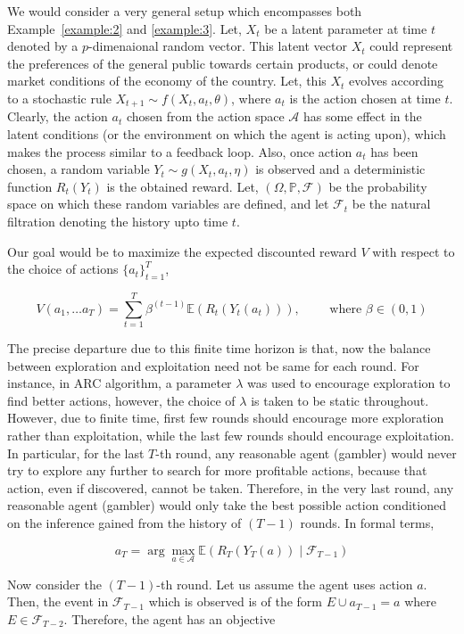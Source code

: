 \documentclass[11pt]{article}
\newcommand{\E}{\mathbb{E}}
\newcommand{\Acal}{\mathcal{A}}
\newcommand{\Fcal}{\mathcal{F}}
\newcommand{\prob}{\mathbb{P}}
\begin{document}
We would consider a very general setup which encompasses both Example~\ref{example:2} and \ref{example:3}. Let, $X_t$ be a latent parameter at time $t$ denoted by a $p$-dimenaional random vector. This latent vector $X_t$ could represent the preferences of the general public towards certain products, or could denote market conditions of the economy of the country. Let, this $X_t$ evolves according to a stochastic rule $X_{t+1} \sim f(X_t, a_t, \theta)$, where $a_t$ is the action chosen at time $t$. Clearly, the action $a_t$ chosen from the action space $\mathcal{A}$ has some effect in the latent conditions (or the environment on which the agent is acting upon), which makes the process similar to a feedback loop. Also, once action $a_t$ has been chosen, a random variable $Y_t \sim g(X_t, a_t, \eta)$ is observed and a deterministic function $R_t(Y_t)$ is the obtained reward. Let, $(\Omega, \prob, \Fcal)$ be the probability space on which these random variables are defined, and let $\Fcal_{t}$ be the natural filtration denoting the history upto time $t$.

Our goal would be to maximize the expected discounted reward $V$ with respect to the choice of actions $\{a_t\}_{t = 1}^{T}$,

$$
V(a_1, \dots a_T) = \sum_{t = 1}^T \beta^{(t-1)} \E(R_t(Y_t(a_t))), \qquad \text{ where } \beta \in (0, 1)
$$

The precise departure due to this finite time horizon is that, now the balance between exploration and exploitation need not be same for each round. For instance, in ARC algorithm, a parameter $\lambda$ was used to encourage exploration to find better actions, however, the choice of $\lambda$ is taken to be static throughout. However, due to finite time, first few rounds should encourage more exploration rather than exploitation, while the last few rounds should encourage exploitation. In particular, for the last $T$-th round, any reasonable agent (gambler) would never try to explore any further to search for more profitable actions, because that action, even if discovered, cannot be taken. Therefore, in the very last round, any reasonable agent (gambler) would only take the best possible action conditioned on the inference gained from the history of $(T-1)$ rounds. In formal terms, 

$$
a_T = \arg\max_{a \in \Acal} \E(R_T(Y_T(a)) \mid \Fcal_{T-1})
$$


Now consider the $(T-1)$-th round. Let us assume the agent uses action $a$. Then, the event in $\Fcal_{T-1}$ which is observed is of the form $E \cup {a_{T-1} = a}$ where $E \in \Fcal_{T-2}$. Therefore, the agent has an objective 
\end{document}
